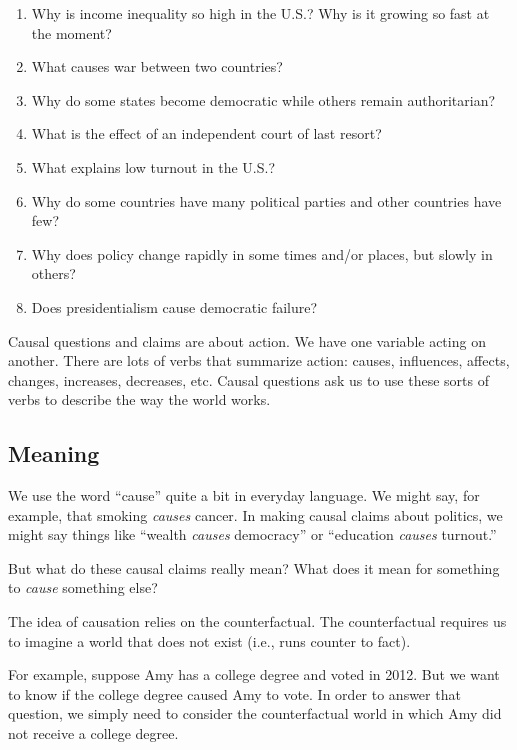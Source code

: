 \documentclass[]{book}
\providecommand{\tightlist}{%
  \setlength{\itemsep}{0pt}\setlength{\parskip}{0pt}}
\theoremstyle{definition}
\theoremstyle{definition}
\theoremstyle{definition}
\theoremstyle{remark}
\begin{document}
\begin{enumerate}
\def\labelenumi{\arabic{enumi}.}
\tightlist
\item
  Why is income inequality so high in the U.S.? Why is it growing so
  fast at the moment?
\item
  What causes war between two countries?
\item
  Why do some states become democratic while others remain
  authoritarian?
\item
  What is the effect of an independent court of last resort?
\item
  What explains low turnout in the U.S.?
\item
  Why do some countries have many political parties and other countries
  have few?
\item
  Why does policy change rapidly in some times and/or places, but slowly
  in others?
\item
  Does presidentialism cause democratic failure?
\end{enumerate}

Causal questions and claims are about action. We have one variable
acting on another. There are lots of verbs that summarize action:
causes, influences, affects, changes, increases, decreases, etc. Causal
questions ask us to use these sorts of verbs to describe the way the
world works.

\subsection{Meaning}\label{meaning}

We use the word ``cause'' quite a bit in everyday language. We might
say, for example, that smoking \emph{causes} cancer. In making causal
claims about politics, we might say things like ``wealth \emph{causes}
democracy'' or ``education \emph{causes} turnout.''

But what do these causal claims really mean? What does it mean for
something to \emph{cause} something else?

The idea of causation relies on the counterfactual. The counterfactual
requires us to imagine a world that does not exist (i.e., runs counter
to fact).

For example, suppose Amy has a college degree and voted in 2012. But we
want to know if the college degree caused Amy to vote. In order to
answer that question, we simply need to consider the counterfactual
world in which Amy did not receive a college degree.
\end{document}
